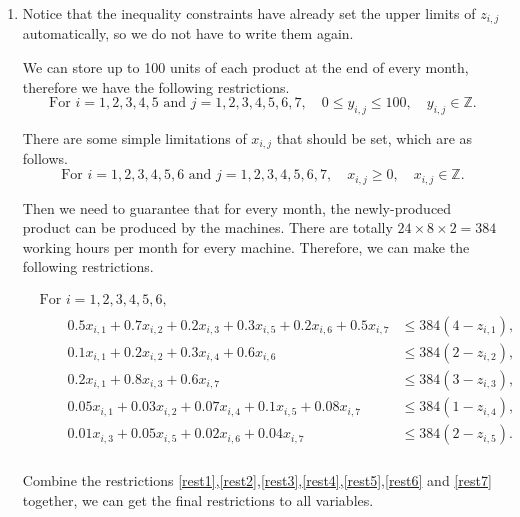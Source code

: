 \documentclass[12pt,a4paper]{article}
\makeatletter
\newtheorem*{solution}{Solution}
\theoremstyle{definition}
\renewenvironment{solution}[1][Solution] {\par\pushQED{\qed}\normalfont\topsep6\p@\@plus6\p@\relax\trivlist\item[\hskip\labelsep\bfseries#1\@addpunct{.}]\ignorespaces}{\popQED\endtrivlist\@endpefalse} \makeatother
\makeatother
\begin{document}
\begin{enumerate}
\begin{solution}
\begin{enumerate}
        Notice that the inequality constraints have already set the upper limits of $z_{i,j}$ automatically, so we do not have to write them again.

        We can store up to 100 units of each product at the end of every month, therefore we have the following restrictions.
        \begin{equation}
        \textrm{For\ } i = 1,2,3,4,5 \textrm{\ and\ } j = 1,2,3,4,5,6,7,\quad 0 \leq y_{i,j} \leq 100, \quad y_{i,j} \in \mathbb{Z}.
        \label{rest5}
        \end{equation}

        There are some simple limitations of $x_{i,j}$ that should be set, which are as follows.
        \begin{equation}
        \textrm{For\ } i = 1,2,3,4,5,6 \textrm{\ and\ } j = 1,2,3,4,5,6,7,\quad x_{i,j} \geq 0, \quad x_{i,j} \in \mathbb{Z}.
        \label{rest6}
        \end{equation}

        Then we need to guarantee that for every month, the newly-produced product can be produced by the machines. There are totally $24 \times 8 \times 2 = 384$ working hours per month for every machine. Therefore, we can make the following restrictions.

        \begin{equation}
        \begin{aligned}
        & \textrm{For\ } i = 1,2,3,4,5,6, \\
        & \begin{aligned}
        && 0.5 x_{i,1} + 0.7 x_{i,2} + 0.2 x_{i,3} + 0.3 x_{i,5} + 0.2 x_{i,6} + 0.5 x_{i,7} & \leq 384(4 - z_{i,1}), \\
        && 0.1 x_{i,1} + 0.2 x_{i,2} + 0.3 x_{i,4} + 0.6 x_{i,6} & \leq 384(2 - z_{i,2}), \\
	    && 0.2 x_{i,1} + 0.8 x_{i,3} + 0.6 x_{i,7} & \leq 384(3 - z_{i,3}), \\
		&& 0.05 x_{i,1} + 0.03 x_{i,2} + 0.07 x_{i,4} + 0.1 x_{i,5} + 0.08 x_{i,7} & \leq 384(1 - z_{i,4}), \\
		&& 0.01 x_{i,3} + 0.05 x_{i,5} + 0.02 x_{i,6} + 0.04 x_{i,7} & \leq 384(2 - z_{i,5}). \\
        \end{aligned}
        \end{aligned}
        \label{rest7}
        \end{equation}

        Combine the restrictions \eqref{rest1},\eqref{rest2},\eqref{rest3},\eqref{rest4},\eqref{rest5},\eqref{rest6} and \eqref{rest7} together, we can get the final restrictions to all variables.


\end{enumerate}
\end{solution}
\end{enumerate}
\end{document}
